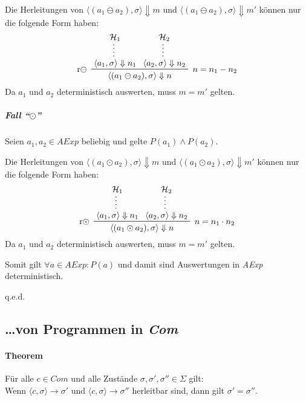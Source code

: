 \documentclass[a4paper, 11pt, accentcolor = tud3b]{tudreport}
\newcommand{\qed}{{\hfill q.e.d.}}
\begin{document}
			 		    Die Herleitungen von $ \langle (a _ 1 \ominus a _ 2), \sigma \rangle \Downarrow m $ und $ \langle (a _ 1 \ominus a _ 2), \sigma \rangle \Downarrow m' $ können nur die folgende Form haben:
			 		    \begin{equation*}
				 		    \prftree[l, r]
					 		    { $ n = n _ 1 - n _ 2 $ }
					 		    { r$ \ominus $ }
					 		    { \prfsummary{\mathcal{H} _ 1}{\langle a _ 1, \sigma \rangle \Downarrow n _ 1} }
					 		    { \prfsummary{\mathcal{H} _ 2}{\langle a _ 2, \sigma \rangle \Downarrow n _ 2} }
					 		    { \langle (a _ 1 \ominus a _ 2), \sigma \rangle \Downarrow n }
			 		    \end{equation*}
			 		    Da $ a _ 1 $ und $ a _ 2 $ deterministisch auswerten, muss $ m = m' $ gelten.
		 		    
		 		    \subparagraph{Fall \enquote{$ \odot $}}
			 		    Seien $ a _ 1, a _ 2 \in \textit{AExp} $ beliebig und gelte $ P(a _ 1) \land P(a _ 2) $.
			 		    
			 		    Die Herleitungen von $ \langle (a _ 1 \odot a _ 2), \sigma \rangle \Downarrow m $ und $ \langle (a _ 1 \odot a _ 2), \sigma \rangle \Downarrow m' $ können nur die folgende Form haben:
			 		    \begin{equation*}
				 		    \prftree[l, r]
					 		    { $ n = n _ 1 \cdot n _ 2 $ }
					 		    { r$ \odot $ }
					 		    { \prfsummary{\mathcal{H} _ 1}{\langle a _ 1, \sigma \rangle \Downarrow n _ 1} }
					 		    { \prfsummary{\mathcal{H} _ 2}{\langle a _ 2, \sigma \rangle \Downarrow n _ 2} }
					 		    { \langle (a _ 1 \odot a _ 2), \sigma \rangle \Downarrow n }
			 		    \end{equation*}
			 		    Da $ a _ 1 $ und $ a _ 2 $ deterministisch auswerten, muss $ m = m' $ gelten.
		 		    
		 		    Somit gilt $ \forall a \in \textit{AExp} : P(a) $ und damit sind Auswertungen in \textit{AExp} deterministisch.
		 		    
		 		    \qed
	 		    
		    
		    \subsection{\dots von Programmen in \textit{Com}}
			    \paragraph{Theorem}
				    Für alle $ c \in \textit{Com} $ und alle Zustände $ \sigma, \sigma', \sigma'' \in \Sigma $ gilt: \\
				    Wenn $ \langle c, \sigma \rangle \rightarrow \sigma' $ und $ \langle c, \sigma \rangle \rightarrow \sigma'' $ herleitbar sind, dann gilt $ \sigma' = \sigma'' $.
			    
\end{document}
